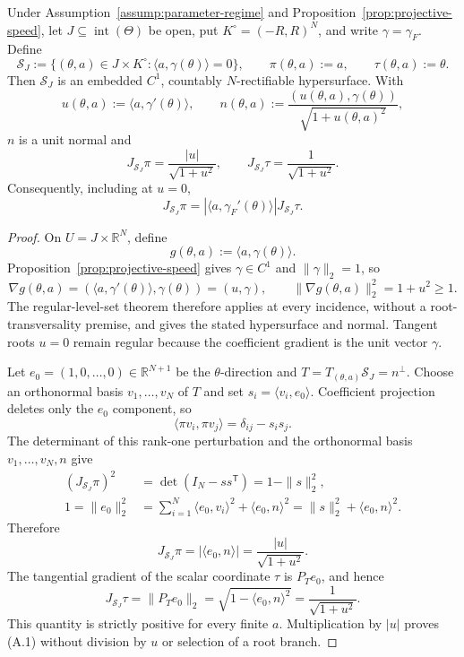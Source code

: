 \begin{lemma}
\label{lem:incidence-jacobians}
Under Assumption~\ref{assump:parameter-regime} and
Proposition~\ref{prop:projective-speed}, let
$J\subseteq\operatorname{int}(\Theta)$ be open, put
$K^\circ=(-R,R)^N$, and write $\gamma=\gamma_F$.  Define
\[
\mathcal S_J
:=\{(\theta,a)\in J\times K^\circ:
       \langle a,\gamma(\theta)\rangle=0\},
\qquad
\pi(\theta,a):=a,
\qquad
\tau(\theta,a):=\theta.
\]
Then $\mathcal S_J$ is an embedded $C^1$, countably $N$-rectifiable
hypersurface.  With
\[
u(\theta,a):=\langle a,\gamma'(\theta)\rangle,
\qquad
n(\theta,a):=\frac{(u(\theta,a),\gamma(\theta))}{\sqrt{1+u(\theta,a)^2}},
\]
$n$ is a unit normal and
\[
J_{\mathcal S_J}\pi
=\frac{|u|}{\sqrt{1+u^2}},
\qquad
J_{\mathcal S_J}\tau
=\frac1{\sqrt{1+u^2}}.
\]
Consequently, including at $u=0$,
\[
J_{\mathcal S_J}\pi
=|\langle a,\gamma_F'(\theta)\rangle|
 J_{\mathcal S_J}\tau.
\tag{A.1}
\]
\end{lemma}

\begin{proof}
On $U=J\times\mathbb R^N$, define
\[
g(\theta,a):=\langle a,\gamma(\theta)\rangle.
\]
Proposition~\ref{prop:projective-speed} gives $\gamma\in C^1$ and
$\|\gamma\|_2=1$, so
\[
\nabla g(\theta,a)
=(\langle a,\gamma'(\theta)\rangle,\gamma(\theta))=(u,\gamma),
\qquad
\|\nabla g(\theta,a)\|_2^2=1+u^2\geq1.
\]
The regular-level-set theorem \citep{lee2013smooth} therefore applies at
every incidence, without a root-transversality premise, and gives the stated
hypersurface and normal.  Tangent roots $u=0$ remain regular because the
coefficient gradient is the unit vector $\gamma$.

Let $e_0=(1,0,\ldots,0)\in\mathbb R^{N+1}$ be the $\theta$-direction and
$T=T_{(\theta,a)}\mathcal S_J=n^\perp$.  Choose an orthonormal basis
$v_1,\ldots,v_N$ of $T$ and set $s_i=\langle v_i,e_0\rangle$.  Coefficient
projection deletes only the $e_0$ component, so
\[
\langle\pi v_i,\pi v_j\rangle=\delta_{ij}-s_is_j.
\]
The determinant of this rank-one perturbation and the orthonormal basis
$v_1,\ldots,v_N,n$ give
\[
\begin{aligned}
(J_{\mathcal S_J}\pi)^2
&=\det(I_N-ss^{\mathsf T})=1-\|s\|_2^2,\\
1=\|e_0\|_2^2
&=\sum_{i=1}^N\langle e_0,v_i\rangle^2
 +\langle e_0,n\rangle^2
=\|s\|_2^2+\langle e_0,n\rangle^2.
\end{aligned}
\]
Therefore
\[
J_{\mathcal S_J}\pi
=|\langle e_0,n\rangle|
=\frac{|u|}{\sqrt{1+u^2}}.
\]
The tangential gradient of the scalar coordinate $\tau$ is $P_Te_0$, and
hence
\[
J_{\mathcal S_J}\tau
=\|P_Te_0\|_2
=\sqrt{1-\langle e_0,n\rangle^2}
=\frac1{\sqrt{1+u^2}}.
\]
This quantity is strictly positive for every finite $a$.  Multiplication by
$|u|$ proves (A.1) without division by $u$ or selection of a root branch.
\end{proof}


